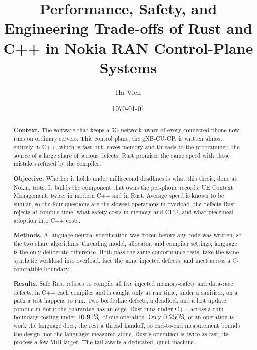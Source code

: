 \documentclass[english,twoside,openright,a4paper,censored,csm,software-track-2020]{HYthesisML}
\title{Performance, Safety, and Engineering Trade-offs of Rust and C++ in Nokia RAN Control-Plane Systems}
\author{Ha Vien}
\date{\today}
\begin{document}
\maketitle


{\singlespacing
\begin{otherlanguage}{english}
\begin{abstract}
\noindent\textbf{Context.}
The software that keeps a 5G network aware of every connected phone now runs on ordinary
servers. This control plane, the gNB-CU-CP, is written almost entirely in C++, which is fast
but leaves memory and threads to the programmer, the source of a large share of serious
defects. Rust promises the same speed with those mistakes refused by the compiler.

\noindent\textbf{Objective.}
Whether it holds under millisecond deadlines is what this thesis, done at Nokia, tests. It
builds the component that owns the per-phone records, UE Context Management, twice: in modern
C++ and in Rust. Average speed is known to be similar, so the four questions are the slowest
operations in overload, the defects Rust rejects at compile time, what safety costs in memory
and CPU, and what piecemeal adoption into C++ costs.

\noindent\textbf{Methods.}
A language-neutral specification was frozen before any code was written, so the two share
algorithms, threading model, allocator, and compiler settings; language is the only deliberate
difference. Both pass the same conformance tests, take the same synthetic workload into
overload, face the same injected defects, and meet across a C-compatible boundary.

\noindent\textbf{Results.}
Safe Rust refuses to compile all five injected memory-safety and data-race defects; in C++ each
compiles and is caught only at run time, under a sanitiser, on a path a test happens to run. Two borderline defects, a deadlock and a lost update, compile in both: the
guarantee has an edge. Rust runs under C++
across a thin boundary costing under $10.91\%$ of one operation. Only
$0.250\%$ of an operation is work the language does, the rest a thread handoff,
so end-to-end measurement bounds the design, not the language; measured alone, Rust's operation
is twice as fast, its process a few MiB larger. The tail awaits a dedicated, quiet machine.


\end{abstract}
\end{otherlanguage}}
\end{document}
